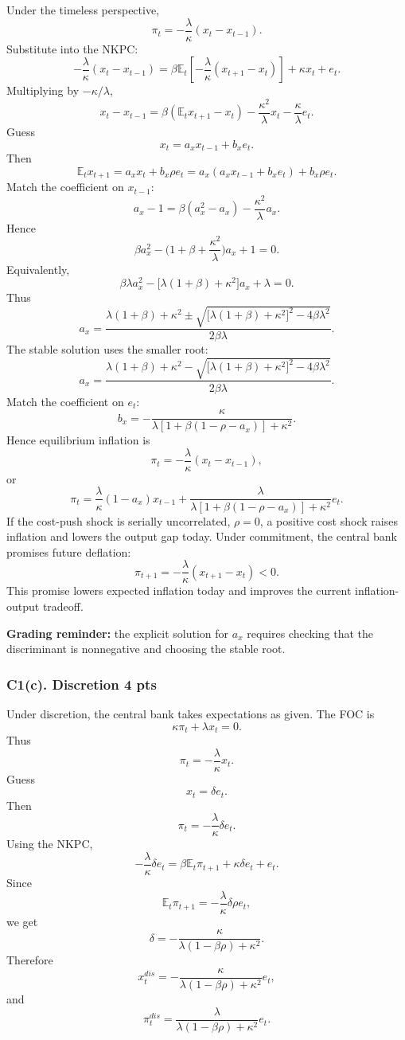 \documentclass[11pt]{article}
\begin{document}
Under the timeless perspective,
\[
\pi_t=-\frac{\lambda}{\kappa}(x_t-x_{t-1}).
\]
Substitute into the NKPC:
\[
-\frac{\lambda}{\kappa}(x_t-x_{t-1})
=
\beta \mathbb{E}_t\left[-\frac{\lambda}{\kappa}(x_{t+1}-x_t)\right]
+\kappa x_t+e_t.
\]
Multiplying by \(-\kappa/\lambda\),
\[
x_t-x_{t-1}
=
\beta(\mathbb{E}_tx_{t+1}-x_t)
-\frac{\kappa^2}{\lambda}x_t
-\frac{\kappa}{\lambda}e_t.
\]
Guess
\[
x_t=a_xx_{t-1}+b_xe_t.
\]
Then
\[
\mathbb{E}_tx_{t+1}=a_xx_t+b_x\rho e_t
=a_x(a_xx_{t-1}+b_xe_t)+b_x\rho e_t.
\]
Match the coefficient on \(x_{t-1}\):
\[
a_x-1
=
\beta(a_x^2-a_x)-\frac{\kappa^2}{\lambda}a_x.
\]
Hence
\[
\beta a_x^2-\bigg(1+\beta+\frac{\kappa^2}{\lambda}\bigg)a_x+1=0.
\]
Equivalently,
\[
\beta\lambda a_x^2-\big[\lambda(1+\beta)+\kappa^2\big]a_x+\lambda=0.
\]
Thus
\[
a_x
=
\frac{
\lambda(1+\beta)+\kappa^2
\pm
\sqrt{\big[\lambda(1+\beta)+\kappa^2\big]^2-4\beta\lambda^2}
}{2\beta\lambda}.
\]
The stable solution uses the smaller root:
\[
a_x
=
\frac{
\lambda(1+\beta)+\kappa^2
-
\sqrt{\big[\lambda(1+\beta)+\kappa^2\big]^2-4\beta\lambda^2}
}{2\beta\lambda}.
\]
Match the coefficient on \(e_t\):
\[
b_x
=
-\frac{\kappa}{
\lambda[1+\beta(1-\rho-a_x)]+\kappa^2
}.
\]
Hence equilibrium inflation is
\[
\pi_t
=
-\frac{\lambda}{\kappa}(x_t-x_{t-1}),
\]
or
\[
\pi_t
=
\frac{\lambda}{\kappa}(1-a_x)x_{t-1}
+
\frac{\lambda}{
\lambda[1+\beta(1-\rho-a_x)]+\kappa^2
}e_t.
\]
If the cost-push shock is serially uncorrelated, \(\rho=0\), a positive cost shock raises inflation and lowers the output gap today. Under commitment, the central bank promises future deflation:
\[
\pi_{t+1}
=
-\frac{\lambda}{\kappa}(x_{t+1}-x_t)<0.
\]
This promise lowers expected inflation today and improves the current inflation-output tradeoff.

\textbf{Grading reminder:} the explicit solution for \(a_x\) requires checking that the discriminant is nonnegative and choosing the stable root.

\subsubsection*{C1(c). Discretion \hfill 4 pts}

Under discretion, the central bank takes expectations as given. The FOC is
\[
\kappa \pi_t+\lambda x_t=0.
\]
Thus
\[
\pi_t=-\frac{\lambda}{\kappa}x_t.
\]
Guess
\[
x_t=\delta e_t.
\]
Then
\[
\pi_t=-\frac{\lambda}{\kappa}\delta e_t.
\]
Using the NKPC,
\[
-\frac{\lambda}{\kappa}\delta e_t
=
\beta \mathbb{E}_t\pi_{t+1}
+\kappa\delta e_t+e_t.
\]
Since
\[
\mathbb{E}_t\pi_{t+1}
=
-\frac{\lambda}{\kappa}\delta \rho e_t,
\]
we get
\[
\delta
=
-\frac{\kappa}{
\lambda(1-\beta\rho)+\kappa^2
}.
\]
Therefore
\[
x_t^{dis}
=
-\frac{\kappa}{
\lambda(1-\beta\rho)+\kappa^2
}e_t,
\]
and
\[
\pi_t^{dis}
=
\frac{\lambda}{
\lambda(1-\beta\rho)+\kappa^2
}e_t.
\]
\end{document}
